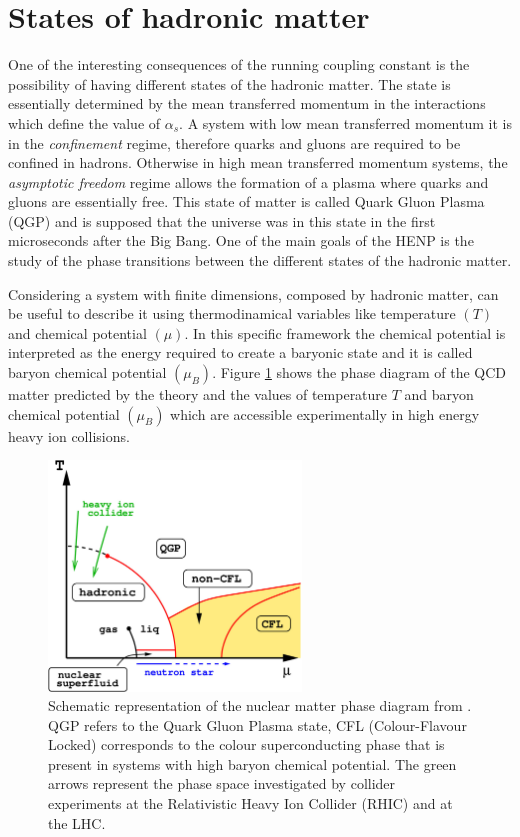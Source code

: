 %
%
\section{States of hadronic matter}
\label{sec:1.2}

One of the interesting consequences of the running coupling constant is the possibility of having
different states of the hadronic matter. The state is essentially determined by the mean transferred 
momentum in the interactions which define the value of $\alpha_{s}$. 
A system with low mean transferred momentum it is in the \textit{confinement} regime, therefore quarks
and gluons are required to be confined in hadrons. Otherwise in high mean transferred momentum systems,
the \textit{asymptotic freedom} regime allows the formation of a plasma where quarks and gluons are
essentially free. This state of matter is called Quark Gluon Plasma (QGP) and is supposed that the 
universe was in this state in the first microseconds after the Big Bang.
One of the main goals of the HENP is the study of the phase transitions between the different
states of the hadronic matter.

Considering a system with finite dimensions, composed by hadronic matter, can be useful to describe it 
using thermodinamical variables like temperature $(T)$ and chemical potential $(\mu)$. In this
specific framework the chemical potential is interpreted as the energy required to create a 
baryonic state and it is called baryon chemical potential $(\mu_{B})$. 
Figure \ref{fig:qgpdiagram} shows the phase diagram of the QCD matter predicted by the theory and 
the values of temperature $T$ and baryon chemical potential $(\mu_{B})$ which are accessible
experimentally in high energy heavy ion collisions.

\begin{figure}
    \centering
    \includegraphics[width=0.6\textwidth]{gfx/qgpphase}
	\caption{Schematic representation of the nuclear matter phase diagram from \cite{qgpphase}. QGP refers to the Quark Gluon Plasma state, CFL (Colour-Flavour Locked) corresponds to the colour superconducting phase that is present in systems with high baryon chemical potential. The green arrows represent the phase space investigated by collider experiments at the Relativistic Heavy Ion Collider (RHIC) and at the LHC.}
	\label{fig:qgpdiagram}
\end{figure}

